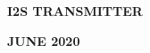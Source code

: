 \documentclass[12pt,a4paper]{report}
\begin{document}
\thispagestyle{logo}
\begin{center}

\vspace{20mm}
\textbf{}
\vspace{5mm}
\\
\textbf{}
\vspace{5mm}
\vspace{5mm}
\\ {\large{\textbf{ I2S TRANSMITTER}}} 
\\{\textbf{}}
\vspace{20mm}
\vspace{10mm}
\vspace{10mm}
\end{center}
\vspace{105mm}
\hspace{60mm}
\textbf{JUNE 2020}



   \newpage




\end{document}
